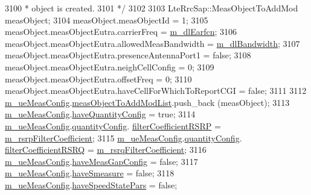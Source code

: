 \begin{DoxyCode}
3100 \textcolor{comment}{   * object is created.}
3101 \textcolor{comment}{   */}
3102 
3103   LteRrcSap::MeasObjectToAddMod measObject;
3104   measObject.measObjectId = 1;
3105   measObject.measObjectEutra.carrierFreq = \hyperlink{classns3_1_1LteEnbRrc_aee99fe7a94ae8ef45983f580e36be04a}{m\_dlEarfcn};
3106   measObject.measObjectEutra.allowedMeasBandwidth = \hyperlink{classns3_1_1LteEnbRrc_afb2dd8321c2d4733572c9240f7bc9751}{m\_dlBandwidth};
3107   measObject.measObjectEutra.presenceAntennaPort1 = \textcolor{keyword}{false};
3108   measObject.measObjectEutra.neighCellConfig = 0;
3109   measObject.measObjectEutra.offsetFreq = 0;
3110   measObject.measObjectEutra.haveCellForWhichToReportCGI = \textcolor{keyword}{false};
3111 
3112   \hyperlink{classns3_1_1LteEnbRrc_a98d0766aa6a671bb20f2996c634e6b17}{m\_ueMeasConfig}.\hyperlink{structns3_1_1LteRrcSap_1_1MeasConfig_a1e32e45b55111bddfdc608cbff780dc2}{measObjectToAddModList}.push\_back (measObject);
3113   \hyperlink{classns3_1_1LteEnbRrc_a98d0766aa6a671bb20f2996c634e6b17}{m\_ueMeasConfig}.\hyperlink{structns3_1_1LteRrcSap_1_1MeasConfig_aeb84564bf645eef57fa27943afa868a4}{haveQuantityConfig} = \textcolor{keyword}{true};
3114   \hyperlink{classns3_1_1LteEnbRrc_a98d0766aa6a671bb20f2996c634e6b17}{m\_ueMeasConfig}.\hyperlink{structns3_1_1LteRrcSap_1_1MeasConfig_aa896a8aa8ac1922552489338f0ad8cd5}{quantityConfig}.
      \hyperlink{structns3_1_1LteRrcSap_1_1QuantityConfig_ac60962e2b022dfa1b9b3d28b7900a4f8}{filterCoefficientRSRP} = \hyperlink{classns3_1_1LteEnbRrc_ab5d107b13d8042f862008b8d440fe3a6}{m\_rsrpFilterCoefficient};
3115   \hyperlink{classns3_1_1LteEnbRrc_a98d0766aa6a671bb20f2996c634e6b17}{m\_ueMeasConfig}.\hyperlink{structns3_1_1LteRrcSap_1_1MeasConfig_aa896a8aa8ac1922552489338f0ad8cd5}{quantityConfig}.
      \hyperlink{structns3_1_1LteRrcSap_1_1QuantityConfig_a5b8c0642e518d9410c533069a442f3f0}{filterCoefficientRSRQ} = \hyperlink{classns3_1_1LteEnbRrc_a505a1db46c8f5b6abe174a536485c44d}{m\_rsrqFilterCoefficient};
3116   \hyperlink{classns3_1_1LteEnbRrc_a98d0766aa6a671bb20f2996c634e6b17}{m\_ueMeasConfig}.\hyperlink{structns3_1_1LteRrcSap_1_1MeasConfig_a8909415c7b07c4b5feafed1bce00e97c}{haveMeasGapConfig} = \textcolor{keyword}{false};
3117   \hyperlink{classns3_1_1LteEnbRrc_a98d0766aa6a671bb20f2996c634e6b17}{m\_ueMeasConfig}.\hyperlink{structns3_1_1LteRrcSap_1_1MeasConfig_aaa9876e139cd41b400edbf5178fecfa9}{haveSmeasure} = \textcolor{keyword}{false};
3118   \hyperlink{classns3_1_1LteEnbRrc_a98d0766aa6a671bb20f2996c634e6b17}{m\_ueMeasConfig}.\hyperlink{structns3_1_1LteRrcSap_1_1MeasConfig_aabf400c6da90071d7f1693e357511efc}{haveSpeedStatePars} = \textcolor{keyword}{false};

\end{DoxyCode}

